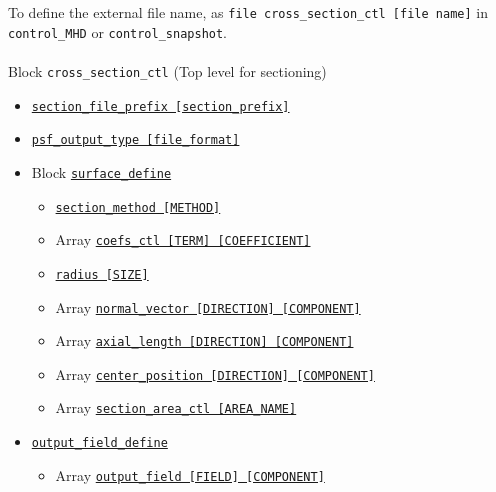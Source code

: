 To define the external file name, as \verb|file cross_section_ctl [file name]| in \verb|control_MHD| or \verb|control_snapshot|. \\
\\
%
Block \verb|cross_section_ctl| (Top level for sectioning)
\label{href_i:cross_section_ctl}
\begin{itemize}
	\item \hyperref[href_t:section_file_prefix]
			{\tt section\_file\_prefix    [section\_prefix]}
	\item \hyperref[href_t:psf_output_type]
			{\tt psf\_output\_type        [file\_format]}
	\item Block \hyperref[href_t:surface_define]{\tt surface\_define}
		\begin{itemize}
			\item \hyperref[href_t:section_method]
				{\tt section\_method    [METHOD]}
			\item Array \hyperref[href_t:psf_coefs_ctl]
				{\tt coefs\_ctl        [TERM]         [COEFFICIENT]}
			\item \hyperref[href_t:psf_radius]{\tt radius    [SIZE]}
			\item Array \hyperref[href_t:psf_normal_vector]
				{\tt normal\_vector    [DIRECTION]    [COMPONENT]}
			\item Array \hyperref[href_t:psf_axial_length]
                {\tt axial\_length     [DIRECTION]    [COMPONENT]}
			\item Array \hyperref[href_t:psf_center_position]
                {\tt center\_position  [DIRECTION]    [COMPONENT]}
%
			\item Array \hyperref[href_t:section_area_ctl]
				{\tt section\_area\_ctl        [AREA\_NAME]}
	\end{itemize}
%
	\item \hyperref[href_t:output_field_define]{\tt output\_field\_define}
		\begin{itemize}
			\item Array \hyperref[href_t:psf_output_field]
                {\tt output\_field     [FIELD]    [COMPONENT]}
		\end{itemize}
\end{itemize}

